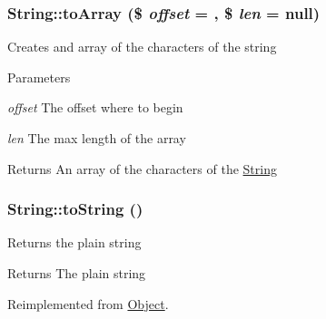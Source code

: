 \hypertarget{classString_abacf7b1614b42312f4f49ca064980139}{
\subsubsection[{toArray}]{\setlength{\rightskip}{0pt plus 5cm}String::toArray (\$ {\em offset} = {}, \/  \$ {\em len} = {\ttfamily null})}}
\label{classString_abacf7b1614b42312f4f49ca064980139}
Creates and array of the characters of the string 
\begin{DoxyParams}{Parameters}
\item[{\em offset}]The offset where to begin \item[{\em len}]The max length of the array \end{DoxyParams}
\begin{DoxyReturn}{Returns}
An array of the characters of the \hyperlink{classString}{String} 
\end{DoxyReturn}
\hypertarget{classString_aa7ef98a0c1a4b8b375baf8791e7b773c}{
\subsubsection[{toString}]{\setlength{\rightskip}{0pt plus 5cm}String::toString ()}}
\label{classString_aa7ef98a0c1a4b8b375baf8791e7b773c}
Returns the plain string \begin{DoxyReturn}{Returns}
The plain string 
\end{DoxyReturn}


Reimplemented from \hyperlink{classObject}{Object}.

